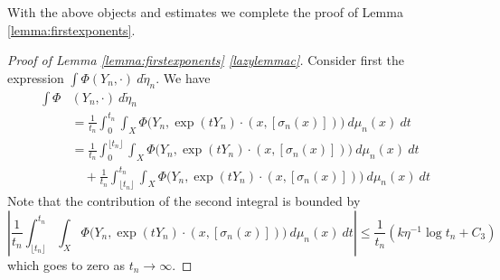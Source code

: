 \documentclass[10pt,reqno]{amsart}
\theoremstyle{Theorem}
\theoremstyle{definition}
\theoremstyle{remark}
\newcommand{\td}{\tilde}
\newcommand{\inv}{^{-1}}
\begin{document}
With the above objects and estimates we complete the proof of  Lemma \ref{lemma:firstexponents}.
\begin{proof}[Proof of Lemma \ref{lemma:firstexponents} \ref{lazylemmac}]
Consider first the expression $\int \Phi (Y_n, \cdot )\  d \td \eta_n.$  We have
\begin{align*}
\int \Phi  & (Y_n, \cdot ) \ d \td \eta_n
\\& =  \frac{1}{t_n}\int_0^{t_n} \int_X \Phi  \big(Y_n,\exp (tY_n) \cdot (x,  [\sigma_n(x)] )\big ) \ d\mu_n(x) \ d t
\\&= \frac{1}{t_n}  \int_0^{\lfloor t_n\rfloor}\int_X  \Phi    \big(Y_n,\exp (tY_n) \cdot (x,  [\sigma_n(x)] )\big )  \ d\mu_n(x) \ d t \\
&\quad
+ \frac{1}{t_n} \int_ {\lfloor t_n\rfloor} ^{t_n}\int_X \Phi    \big(Y_n,\exp (tY_n) \cdot (x,  [\sigma_n(x)] )\big ) \ d\mu_n(x)   \ d t
\end{align*}
Note that the contribution of the second integral is bounded by
$$\left| \frac{1}{t_n} \int_ {\lfloor t_n\rfloor} ^{t_n}\int_X \Phi    \big(Y_n,\exp (tY_n) \cdot (x,  [\sigma_n(x)] )\big ) \ d\mu_n(x)   \ d t \right|
\le \frac{1}{t_n}(k\eta\inv \log t_n +  C_3)$$
which goes to zero as $t_n\to \infty$.



\end{proof}
\end{document}
